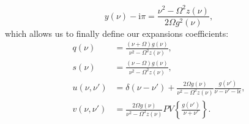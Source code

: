 \documentclass{article}
\begin{document}
\begin{equation}
y(\nu) - \mathrm{i}\pi = \frac{\nu^2 - \Omega^2z(\nu)}{2\Omega g^2(\nu)},
\end{equation}
which allows us to finally define our expansions coefficients:
\begin{equation}
\begin{split}
q(\nu) &= \frac{(\nu + \Omega)g(\nu)}{\nu^2 - \Omega^2 z(\nu)},\\
s(\nu) &= \frac{(\nu - \Omega)g(\nu)}{\nu^2 - \Omega^2 z(\nu)},\\
u(\nu,\nu') &= \delta(\nu - \nu') + \frac{2\Omega g(\nu)}{\nu^2 - \Omega^2z(\nu)}\frac{g(\nu')}{\nu - \nu' - \mathrm{i}\epsilon},\\
v(\nu,\nu') &= \frac{2\Omega g(\nu)}{\nu^2 - \Omega^2z(\nu)}PV\left\{\frac{g(\nu')}{\nu + \nu'}\right\}.
\end{split}
\end{equation}
\end{document}

